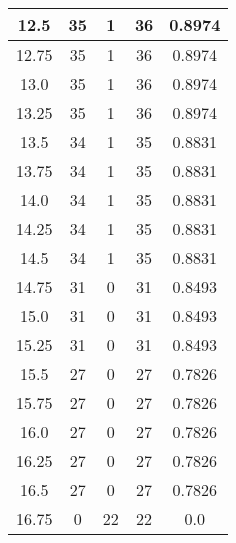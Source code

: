 \documentclass[letterpaper, 12pt]{article}
\begin{document}
\begin{longtable}{|c|c|c|c|c|}
12.5 & 35 & 1 & 36 & 0.8974 \\
\hline
12.75 & 35 & 1 & 36 & 0.8974 \\
\hline
13.0 & 35 & 1 & 36 & 0.8974 \\
\hline
13.25 & 35 & 1 & 36 & 0.8974 \\
\hline
13.5 & 34 & 1 & 35 & 0.8831 \\
\hline
13.75 & 34 & 1 & 35 & 0.8831 \\
\hline
14.0 & 34 & 1 & 35 & 0.8831 \\
\hline
14.25 & 34 & 1 & 35 & 0.8831 \\
\hline
14.5 & 34 & 1 & 35 & 0.8831 \\
\hline
14.75 & 31 & 0 & 31 & 0.8493 \\
\hline
15.0 & 31 & 0 & 31 & 0.8493 \\
\hline
15.25 & 31 & 0 & 31 & 0.8493 \\
\hline
15.5 & 27 & 0 & 27 & 0.7826 \\
\hline
15.75 & 27 & 0 & 27 & 0.7826 \\
\hline
16.0 & 27 & 0 & 27 & 0.7826 \\
\hline
16.25 & 27 & 0 & 27 & 0.7826 \\
\hline
16.5 & 27 & 0 & 27 & 0.7826 \\
\hline
16.75 & 0 & 22 & 22 & 0.0 \\
\hline
\end{longtable}
\end{document}
